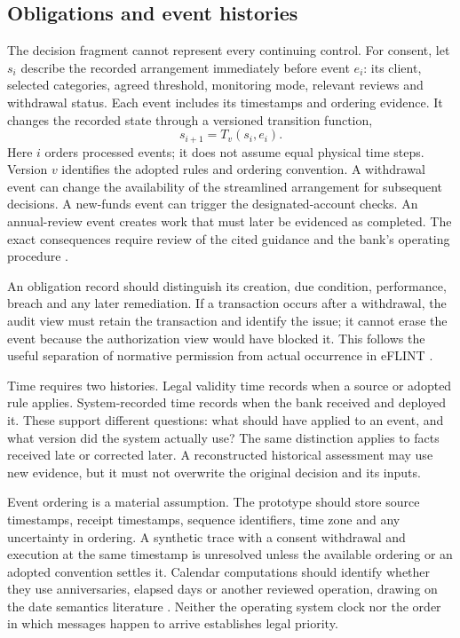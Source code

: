\subsection{Obligations and event histories}

The decision fragment cannot represent every continuing control. For consent,
let $s_i$ describe the recorded arrangement immediately before event $e_i$:
its client, selected categories, agreed threshold, monitoring mode, relevant
reviews and withdrawal status. Each event includes its timestamps and ordering
evidence. It changes the recorded state through a
versioned transition function,
\begin{equation}
 s_{i+1}=T_v(s_i,e_i).
 \label{eq:transition}
\end{equation}
Here $i$ orders processed events; it does not assume equal physical time
steps. Version $v$ identifies the adopted rules and ordering convention. A
withdrawal event can change the availability of the streamlined arrangement for
subsequent decisions. A new-funds event can trigger the designated-account
checks. An annual-review event creates work that must later be evidenced as
completed. The exact consequences require review of the cited guidance and the
bank's operating procedure \citep{sfcspiannex1,sfcspiannex2}.

An obligation record should distinguish its creation, due condition, performance,
breach and any later remediation. If a transaction occurs after a withdrawal, the
audit view must retain the transaction and identify the issue; it cannot erase
the event because the authorization view would have blocked it. This follows the
useful separation of normative permission from actual occurrence in eFLINT
\citep{eflint2026}.

Time requires two histories. Legal validity time records when a source or adopted
rule applies. System-recorded time records when the bank received and deployed
it. These support different questions: what should have applied to an event, and
what version did the system actually use? The same distinction applies to facts
received late or corrected later. A reconstructed historical assessment may use
new evidence, but it must not overwrite the original decision and its inputs.

Event ordering is a material assumption. The prototype should store source
timestamps, receipt timestamps, sequence identifiers, time zone and any uncertainty
in ordering. A synthetic trace with a consent withdrawal and execution at the
same timestamp is unresolved unless the available ordering or an adopted
convention settles it. Calendar computations should identify whether they use
anniversaries, elapsed days or another reviewed operation, drawing on the date
semantics literature \citep{dates2024}. Neither the operating system clock nor the
order in which messages happen to arrive establishes legal priority.

